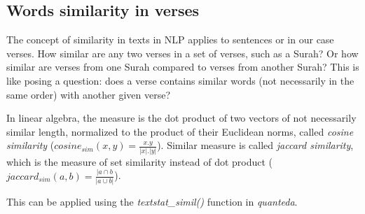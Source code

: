\documentclass[
]{article}
\begin{document}
\hypertarget{words-similarity-in-verses}{%
\subsection{Words similarity in verses}\label{words-similarity-in-verses}}

The concept of similarity in texts in NLP applies to sentences or in our case verses. How similar are any two verses in a set of verses, such as a Surah? Or how similar are verses from one Surah compared to verses from another Surah? This is like posing a question: does a verse contains similar words (not necessarily in the same order) with another given verse?

In linear algebra, the measure is the dot product of two vectors of not necessarily similar length, normalized to the product of their Euclidean norms, called \emph{cosine similarity} (\(cosine_{sim}(x,y) = \frac{x.y}{|x|.|y|}\)). Similar measure is called \emph{jaccard similarity}, which is the measure of set similarity instead of dot product (\(jaccard_{sim}(a,b) = \frac{|a \cap b}{|a \cup b|}\)).

This can be applied using the \emph{textstat\_simil()} function in \emph{quanteda}.
\end{document}

